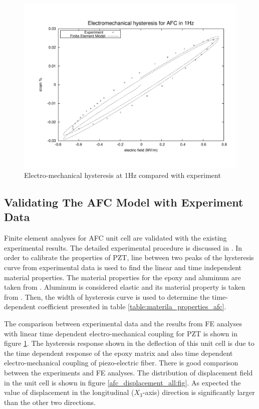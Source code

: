 \begin{figure} 
\centering
\includegraphics[width=5.0in]{./chap_4_structural_analyses/afc_unit_cell/comparison/afc_result_electric_field_vs_strain.pdf}
\caption{Electro-mechanical hysteresis at 1Hz compared with experiment}
\label{fig:afc_result_electric_field_vs_strain}
\end{figure} 

\subsection{Validating The AFC Model with Experiment Data}
Finite element analyses for AFC unit cell are validated with the existing experimental results.
The detailed experimental procedure is discussed in \cite{atillah2014}.
In order to calibrate the properties of PZT, line between two peaks of the hysteresis curve from experimental data is used to find the linear and time independent material properties.
The material properties for the epoxy and aluminum are taken from  \cite{atitallah2014parametric}.
Aluminum is considered elastic and its material property is taken from \cite{Aluminium_wikipedia}.
Then, the width of hysteresis curve is used to determine the time-dependent coefficient presented in table \ref{table:materila_properties_afc}.
 
The comparison between experimental data and the results from FE analyses with linear time dependent electro-mechanical coupling for PZT is shown in figure \ref{fig:afc_result_electric_field_vs_strain}.
The hysteresis response shown in the deflection of this unit cell is due to the time dependent response of the epoxy matrix and also time dependent electro-mechanical coupling of piezo-electric fiber. 
There is good comparison between the experiments and FE analyses.
The distribution of displacement field in the unit cell is shown in figure \ref{afc_displacement_all:fig}.
As expected the value of displacement in the longitudinal ($X_3$-axis) direction is significantly larger than the other two directions.



